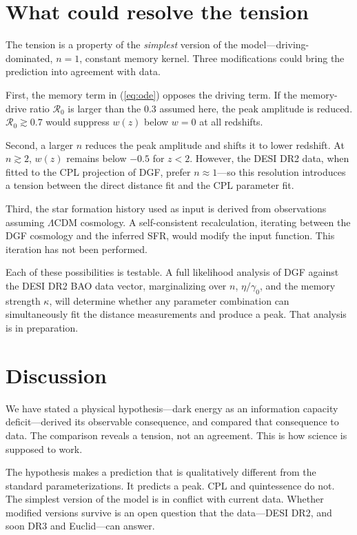 \documentclass[12pt,a4paper]{article}
\begin{document}
\section*{What could resolve the tension}

The tension is a property of the {\it simplest} version of the model---driving-dominated, $n=1$, constant memory kernel. Three modifications could bring the prediction into agreement with data.

First, the memory term in (\ref{eq:ode}) opposes the driving term. If the memory-drive ratio $\mathcal{R}_0$ is larger than the $0.3$ assumed here, the peak amplitude is reduced. $\mathcal{R}_0\gtrsim0.7$ would suppress $w(z)$ below $w=0$ at all redshifts.

Second, a larger $n$ reduces the peak amplitude and shifts it to lower redshift. At $n\gtrsim2$, $w(z)$ remains below $-0.5$ for $z<2$. However, the DESI DR2 data, when fitted to the CPL projection of DGF, prefer $n\approx1$---so this resolution introduces a tension between the direct distance fit and the CPL parameter fit.

Third, the star formation history used as input is derived from observations assuming $\Lambda$CDM cosmology. A self-consistent recalculation, iterating between the DGF cosmology and the inferred SFR, would modify the input function. This iteration has not been performed.

Each of these possibilities is testable. A full likelihood analysis of DGF against the DESI DR2 BAO data vector, marginalizing over $n$, $\eta/\gamma_0$, and the memory strength $\kappa$, will determine whether any parameter combination can simultaneously fit the distance measurements and produce a peak. That analysis is in preparation.

\section*{Discussion}

We have stated a physical hypothesis---dark energy as an information capacity deficit---derived its observable consequence, and compared that consequence to data. The comparison reveals a tension, not an agreement. This is how science is supposed to work.

The hypothesis makes a prediction that is qualitatively different from the standard parameterizations. It predicts a peak. CPL and quintessence do not. The simplest version of the model is in conflict with current data. Whether modified versions survive is an open question that the data---DESI DR2, and soon DR3 and Euclid---can answer.
\end{document}
